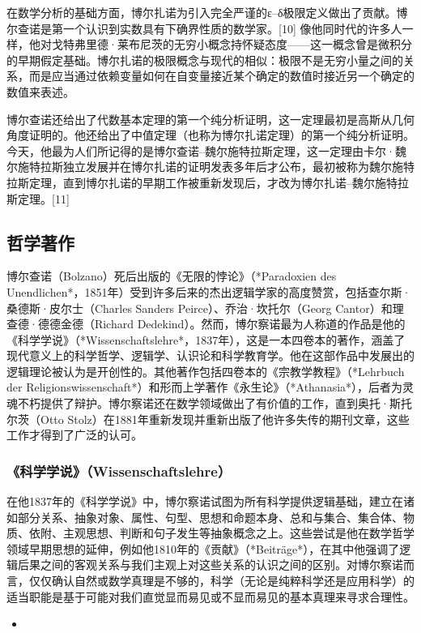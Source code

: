 在数学分析的基础方面，博尔扎诺为引入完全严谨的ε–δ极限定义做出了贡献。博尔查诺是第一个认识到实数具有下确界性质的数学家。[10] 像他同时代的许多人一样，他对戈特弗里德·莱布尼茨的无穷小概念持怀疑态度——这一概念曾是微积分的早期假定基础。博尔扎诺的极限概念与现代的相似：极限不是无穷小量之间的关系，而是应当通过依赖变量如何在自变量接近某个确定的数值时接近另一个确定的数值来表述。

博尔查诺还给出了代数基本定理的第一个纯分析证明，这一定理最初是高斯从几何角度证明的。他还给出了中值定理（也称为博尔扎诺定理）的第一个纯分析证明。今天，他最为人们所记得的是博尔查诺–魏尔施特拉斯定理，这一定理由卡尔·魏尔施特拉斯独立发展并在博尔扎诺的证明发表多年后才公布，最初被称为魏尔施特拉斯定理，直到博尔扎诺的早期工作被重新发现后，才改为博尔扎诺–魏尔施特拉斯定理。[11]
\subsection{哲学著作}  
博尔查诺（Bolzano）死后出版的《无限的悖论》（*Paradoxien des Unendlichen*，1851年）受到许多后来的杰出逻辑学家的高度赞赏，包括查尔斯·桑德斯·皮尔士（Charles Sanders Peirce）、乔治·坎托尔（Georg Cantor）和理查德·德德金德（Richard Dedekind）。然而，博尔察诺最为人称道的作品是他的《科学学说》（*Wissenschaftslehre*，1837年），这是一本四卷本的著作，涵盖了现代意义上的科学哲学、逻辑学、认识论和科学教育学。他在这部作品中发展出的逻辑理论被认为是开创性的。其他著作包括四卷本的《宗教学教程》（*Lehrbuch der Religionswissenschaft*）和形而上学著作《永生论》（*Athanasia*），后者为灵魂不朽提供了辩护。博尔察诺还在数学领域做出了有价值的工作，直到奥托·斯托尔茨（Otto Stolz）在1881年重新发现并重新出版了他许多失传的期刊文章，这些工作才得到了广泛的认可。
\subsubsection{《科学学说》（Wissenschaftslehre）}  
在他1837年的《科学学说》中，博尔察诺试图为所有科学提供逻辑基础，建立在诸如部分关系、抽象对象、属性、句型、思想和命题本身、总和与集合、集合体、物质、依附、主观思想、判断和句子发生等抽象概念之上。这些尝试是他在数学哲学领域早期思想的延伸，例如他1810年的《贡献》（*Beiträge*），在其中他强调了逻辑后果之间的客观关系与我们主观上对这些关系的认识之间的区别。对博尔察诺而言，仅仅确认自然或数学真理是不够的，科学（无论是纯粹科学还是应用科学）的适当职能是基于可能对我们直觉显而易见或不显而易见的基本真理来寻求合理性。
\begin{itemize}
\item 
\end{itemize}